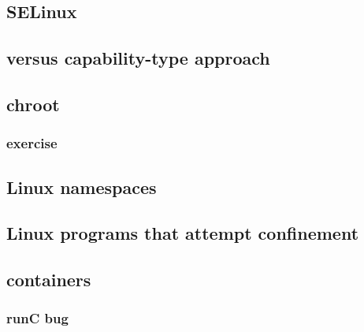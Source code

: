 \subsection{SELinux}


\subsection{versus capability-type approach}


\subsection{chroot}


\subsubsection{exercise}


\subsection{Linux namespaces}




\subsection{Linux programs that attempt confinement}


\subsection{containers}



\subsubsection{runC bug}


